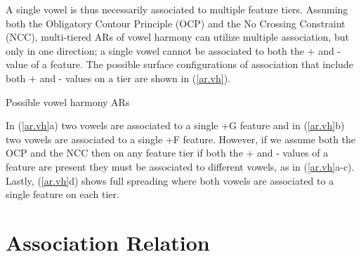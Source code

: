 \documentclass[,doc,floatsintext]{apa6}
\theoremstyle{definition}
\theoremstyle{definition}
\theoremstyle{definition}
\theoremstyle{remark}
\begin{document}
\noindent A single vowel is thus necessarily associated to multiple
feature tiers. Assuming both the Obligatory Contour Principle (OCP) and
the No Crossing Constraint (NCC), multi-tiered ARs of vowel harmony can
utilize multiple association, but only in one direction; a single vowel
cannot be associated to both the + and - value of a feature. The
possible surface configurations of association that include both + and -
values on a tier are shown in (\ref{ar.vh}).

\begin{exe}
\ex \label{ar.vh} Possible vowel harmony ARs \\
\end{exe}

\noindent In (\ref{ar.vh}a) two vowels are associated to a single +G
feature and in (\ref{ar.vh}b) two vowels are associated to a single +F
feature. However, if we assume both the OCP and the NCC then on any
feature tier if both the + and - values of a feature are present they
must be associated to different vowels, as in (\ref{ar.vh}a-c). Lastly,
(\ref{ar.vh}d) shows full spreading where both vowels are associated to
a single feature on each tier.

\section{Association Relation}\label{association-relation}
\end{document}
